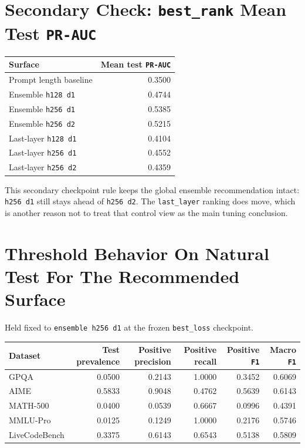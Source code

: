 \documentclass[11pt]{article}
\begin{document}
\section*{Secondary Check: \texttt{best\_rank} Mean Test \texttt{PR-AUC}}
\begin{center}
\small
\begin{tabular}{@{}lr@{}}
\toprule
Surface & Mean test \texttt{PR-AUC} \\
\midrule
Prompt length baseline & 0.3500 \\
Ensemble \texttt{h128 d1} & 0.4744 \\
Ensemble \texttt{h256 d1} & 0.5385 \\
Ensemble \texttt{h256 d2} & 0.5215 \\
Last-layer \texttt{h128 d1} & 0.4104 \\
Last-layer \texttt{h256 d1} & 0.4552 \\
Last-layer \texttt{h256 d2} & 0.4359 \\
\bottomrule
\end{tabular}
\end{center}

This secondary checkpoint rule keeps the global ensemble recommendation intact: \texttt{h256 d1} still stays ahead of \texttt{h256 d2}. The \texttt{last\_layer} ranking does move, which is another reason not to treat that control view as the main tuning conclusion.

\section*{Threshold Behavior On Natural Test For The Recommended Surface}
Held fixed to \texttt{ensemble h256 d1} at the frozen \texttt{best\_loss} checkpoint.

\begin{center}
\small
\setlength{\tabcolsep}{4pt}
\begin{tabular}{@{}lrrrrr@{}}
\toprule
Dataset & Test prevalence & Positive precision & Positive recall & Positive \texttt{F1} & Macro \texttt{F1} \\
\midrule
GPQA & 0.0500 & 0.2143 & 1.0000 & 0.3452 & 0.6069 \\
AIME & 0.5833 & 0.9048 & 0.4762 & 0.5639 & 0.6143 \\
MATH-500 & 0.0400 & 0.0539 & 0.6667 & 0.0996 & 0.4391 \\
MMLU-Pro & 0.0125 & 0.1249 & 1.0000 & 0.2176 & 0.5746 \\
LiveCodeBench & 0.3375 & 0.6143 & 0.6543 & 0.5138 & 0.5809 \\
\bottomrule
\end{tabular}
\end{center}
\end{document}
